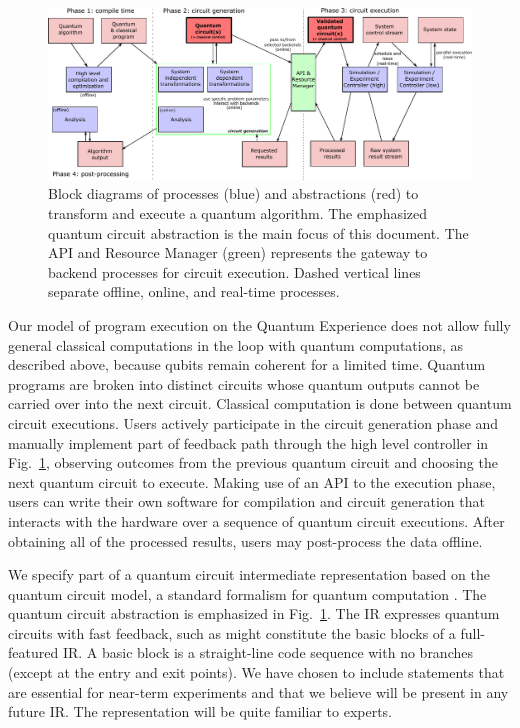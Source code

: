 \documentclass[USenglish,12pt,fleqn]{article} %
\begin{document}
\begin{figure}[h]
\hspace{-0.2cm}
\includegraphics[width=17cm]{blocks.pdf}
\caption{Block diagrams of processes (blue) and abstractions (red) to transform and execute a quantum algorithm. The emphasized quantum circuit abstraction is the main focus of this document. The API and Resource Manager (green) represents the gateway to backend processes for circuit execution. Dashed vertical lines separate offline, online, and real-time processes.
\label{fig:diagram}}
\end{figure}

Our model of program execution on the Quantum Experience does not allow fully general classical computations in the loop with quantum computations, as described above, because qubits remain coherent for a limited time. Quantum programs are broken into distinct circuits whose quantum outputs cannot be carried over into the next circuit. Classical computation is done between quantum circuit executions. Users actively participate in the circuit generation phase and manually implement part of feedback path through the high level controller in Fig.~\ref{fig:diagram}, observing outcomes from the previous quantum circuit and choosing the next quantum circuit to execute. Making use of an API to the execution phase, users can write their own software for compilation and circuit generation that interacts with the hardware over a sequence of quantum circuit executions. After obtaining all of the processed results, users may post-process the data offline.

We specify part of a quantum circuit intermediate representation based on the quantum circuit model, a standard formalism for quantum computation \cite{NC00}. The quantum circuit abstraction is emphasized in Fig.~\ref{fig:diagram}. The IR expresses quantum circuits with fast feedback, such as might constitute the basic blocks of a full-featured IR. A basic block is a straight-line code sequence with no branches (except at the entry and exit points). We have chosen to include statements that are essential for near-term experiments and that we believe will be present in any future IR. The representation will be quite familiar to experts.
\end{document}
